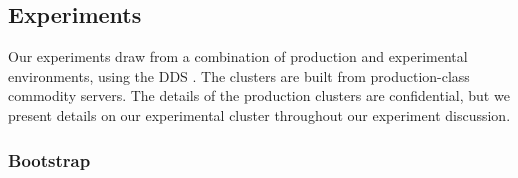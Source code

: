 \subsection{Experiments}
\label{sec:experiments}
%
Our experiments draw from a combination of production and experimental
environments, using the DDS \ES.  The clusters are built from
production-class commodity servers.  The details of the production
clusters are confidential, but we present details on our experimental cluster 
throughout our experiment discussion. 


\subsubsection{Bootstrap}
\label{sec:bootstrap}
%

